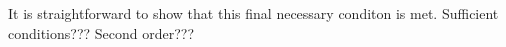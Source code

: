 \documentclass[12pt]{report}
\DeclareMathOperator{\Prm}{\mathrm{P}}
\DeclareMathOperator{\Rbb}{\mathbb{R}}
\begin{document}
It is straightforward to show that this final necessary conditon is met. Sufficient conditions??? Second order???




%
%
%
%
%
%
%
\end{document}
